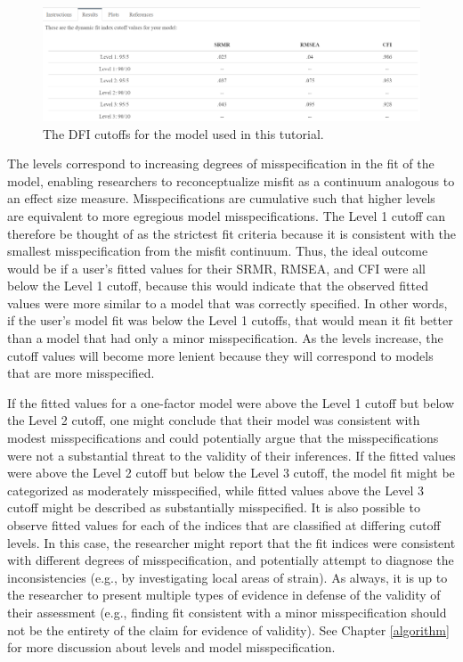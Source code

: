 \documentclass[
]{book}
\begin{document}
\begin{figure}

{\centering \includegraphics[width=1\linewidth]{one-output} 

}

\caption{The DFI cutoffs for the model used in this tutorial.}\label{fig:output-one}
\end{figure}

The levels correspond to increasing degrees of misspecification in the fit of the model, enabling researchers to reconceptualize misfit as a continuum analogous to an effect size measure. Misspecifications are cumulative such that higher levels are equivalent to more egregious model misspecifications. The Level 1 cutoff can therefore be thought of as the strictest fit criteria because it is consistent with the smallest misspecification from the misfit continuum. Thus, the ideal outcome would be if a user's fitted values for their SRMR, RMSEA, and CFI were all below the Level 1 cutoff, because this would indicate that the observed fitted values were more similar to a model that was correctly specified. In other words, if the user's model fit was below the Level 1 cutoffs, that would mean it fit better than a model that had only a minor misspecification. As the levels increase, the cutoff values will become more lenient because they will correspond to models that are more misspecified.

If the fitted values for a one-factor model were above the Level 1 cutoff but below the Level 2 cutoff, one might conclude that their model was consistent with modest misspecifications and could potentially argue that the misspecifications were not a substantial threat to the validity of their inferences. If the fitted values were above the Level 2 cutoff but below the Level 3 cutoff, the model fit might be categorized as moderately misspecified, while fitted values above the Level 3 cutoff might be described as substantially misspecified. It is also possible to observe fitted values for each of the indices that are classified at differing cutoff levels. In this case, the researcher might report that the fit indices were consistent with different degrees of misspecification, and potentially attempt to diagnose the inconsistencies (e.g., by investigating local areas of strain). As always, it is up to the researcher to present multiple types of evidence in defense of the validity of their assessment (e.g., finding fit consistent with a minor misspecification should not be the entirety of the claim for evidence of validity). See Chapter \ref{algorithm} for more discussion about levels and model misspecification.
\end{document}
